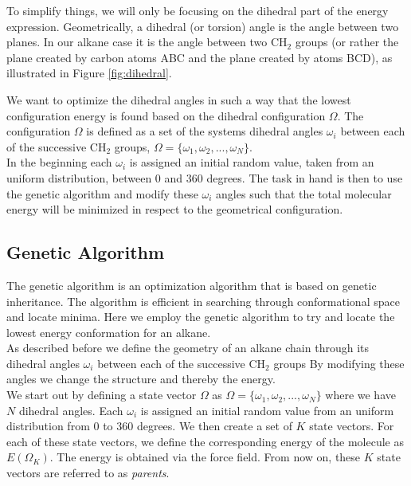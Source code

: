 \documentclass{article}
\begin{document}
To simplify things, we will only be focusing on the dihedral part of the energy expression.
Geometrically, a dihedral (or torsion) angle is the angle between two planes. In our alkane case it is the angle between two CH$_2$ groups (or rather the plane created by carbon atoms ABC and the plane created by atoms BCD), as illustrated in Figure \ref{fig:dihedral}.

We want to optimize the dihedral angles in such a way that the lowest configuration energy is found based on the dihedral configuration $\Omega$.
The configuration $\Omega$ is defined as a set of the systems dihedral angles $\omega_i$ between each of the successive CH$_2$ groups, $\Omega = \{ \omega_1, \omega_2, ... , \omega_N \}$.\\

In the beginning each $\omega_i$ is assigned an initial random value, taken from an uniform distribution, between 0 and 360 degrees.
The task in hand is then to use the genetic algorithm and modify these $\omega_i$ angles such that the total molecular energy will be minimized in respect to the geometrical configuration.

\subsection{Genetic Algorithm}

The genetic algorithm is an optimization algorithm that is based on genetic inheritance.
The algorithm is efficient in searching through conformational space and locate minima.
Here we employ the genetic algorithm to try and locate the lowest energy conformation for an alkane.\\

As described before we define the geometry of an alkane chain through its dihedral angles $\omega_i$ between each of the successive CH$_2$ groups By modifying these angles we change the structure and thereby the energy.\\

We start out by defining a state vector $\Omega$ as $\Omega = \{ \omega_1, \omega_2, ... , \omega_N \}$ where we have $N$ dihedral angles.
Each $\omega_i$ is assigned an initial random value from an uniform distribution from 0 to 360 degrees.
%
% 
%
We then create a set of $K$ state vectors.
For each of these state vectors, we define the corresponding energy of the molecule as $E(\Omega_K)$.
The energy is obtained via the force field.
From now on, these $K$ state vectors are referred to as \emph{parents}.\\
\end{document}
